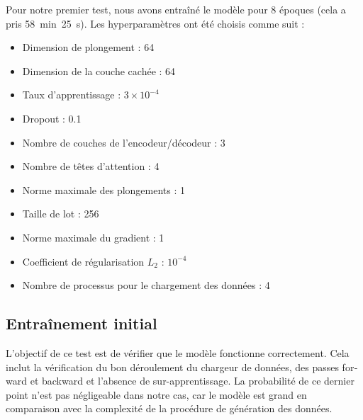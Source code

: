 Pour notre premier test, nous avons entraîné le modèle pour 8 époques (cela a pris 58~min~25~s).
Les hyperparamètres ont été choisis comme suit :
\begin{itemize}
    \item Dimension de plongement : 64
    \item Dimension de la couche cachée : 64
    \item Taux d'apprentissage : \(3 \times 10^{-4}\)
    \item Dropout : 0.1
    \item Nombre de couches de l'encodeur/décodeur : 3
    \item Nombre de têtes d'attention : 4
    \item Norme maximale des plongements : 1
    \item Taille de lot : 256
    \item Norme maximale du gradient : 1
    \item Coefficient de régularisation \(L_2\) : \(10^{-4}\)
    \item Nombre de processus pour le chargement des données : 4
\end{itemize}


\subsection{Entraînement initial}%
\label{sub.results.training.initial}

L'objectif de ce test est de vérifier que le modèle fonctionne correctement.
Cela inclut la vérification du bon déroulement du chargeur de données,
des passes \foreignlanguage{english}{forward} et \foreignlanguage{english}{backward}
et l'absence de sur-apprentissage.
La probabilité de ce dernier point n'est pas négligeable dans notre cas,
car le modèle est grand en comparaison avec la complexité de la procédure de génération des données.

